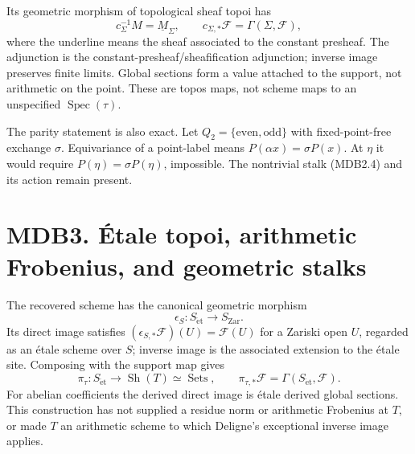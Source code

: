 \documentclass[
]{report}
\begin{document}
Its geometric morphism of topological sheaf topoi has \[
c_\Sigma^{-1}M=\underline M_\Sigma,\qquad
c_{\Sigma,*}\mathcal F=\Gamma(\Sigma,\mathcal F),
\tag{MDB2.7}
\] where the underline means the sheaf associated to the constant
presheaf. The adjunction is the constant-presheaf/sheafification
adjunction; inverse image preserves finite limits. Global sections form
a value attached to the support, not arithmetic on the point. These are
topos maps, not scheme maps to an unspecified
\(\operatorname{Spec}(\tau)\).

The parity statement is also exact. Let
\(Q_2=\{\mathrm{even},\mathrm{odd}\}\) with fixed-point-free exchange
\(\sigma\). Equivariance of a point-label means
\(P(\alpha x)=\sigma P(x)\). At \(\eta\) it would require
\(P(\eta)=\sigma P(\eta)\), impossible. The nontrivial stalk (MDB2.4)
and its action remain present.

\section{MDB3. Étale topoi, arithmetic Frobenius, and geometric
stalks}\label{mdb3.-uxe9tale-topoi-arithmetic-frobenius-and-geometric-stalks}

The recovered scheme has the canonical geometric morphism \[
\epsilon_S:S_{\mathrm{\acute et}}\to S_{\mathrm{Zar}}.
\tag{MDB3.1}
\] Its direct image satisfies
\((\epsilon_{S,*}\mathcal F)(U)=\mathcal F(U)\) for a Zariski open
\(U\), regarded as an étale scheme over \(S\); inverse image is the
associated extension to the étale site. Composing with the support map
gives \[
\pi_\tau:S_{\mathrm{\acute et}}\to\operatorname{Sh}(T)\simeq\operatorname{Sets},
\qquad
\pi_{\tau,*}\mathcal F=\Gamma(S_{\mathrm{\acute et}},\mathcal F).
\tag{MDB3.2}
\] For abelian coefficients the derived direct image is étale derived
global sections. This construction has not supplied a residue norm or
arithmetic Frobenius at \(T\), or made \(T\) an arithmetic scheme to
which Deligne's exceptional inverse image applies.
\end{document}
